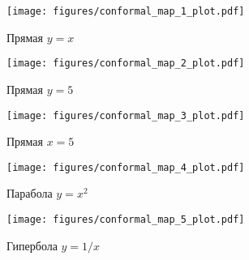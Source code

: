 \begin{frame}
	\begin{figure}
		\centering
		\texttt{[image: figures/conformal\_map\_1\_plot.pdf]}
		\caption{Прямая \(y=x\)}\label{fig:conformal_1}
	\end{figure}
\end{frame}

\begin{frame}
	\begin{figure}
		\centering
		\texttt{[image: figures/conformal\_map\_2\_plot.pdf]}
		\caption{Прямая \(y = 5\)}\label{fig:conformal_2}
	\end{figure}
\end{frame}

\begin{frame}
	\begin{figure}
		\centering
		\texttt{[image: figures/conformal\_map\_3\_plot.pdf]}
		\caption{Прямая \(x = 5\)}\label{fig:conformal_3}
	\end{figure}
\end{frame}



\begin{frame}
	\begin{figure}
		\centering
		\texttt{[image: figures/conformal\_map\_4\_plot.pdf]}
		\caption{Парабола \(y=x^2\)}\label{fig:conformal_4}
	\end{figure}
\end{frame}

\begin{frame}
	\begin{figure}
		\centering
		\texttt{[image: figures/conformal\_map\_5\_plot.pdf]}
		\caption{Гипербола \(y=1/x\)}\label{fig:conformal_5}
	\end{figure}
\end{frame}
